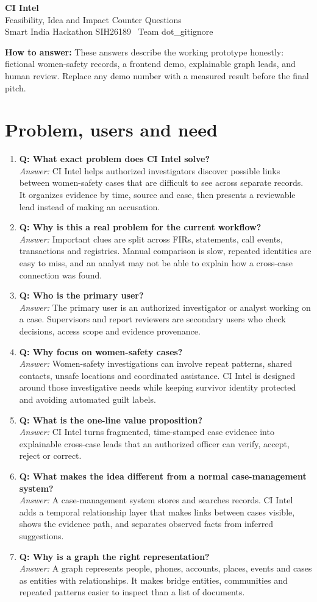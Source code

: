 \documentclass[10pt,a4paper]{article}
\newcommand{\qa}[2]{\item \textbf{\color{navy}Q: #1}\\[-1pt]{\color{coral}\textit{Answer:}} #2}
\newcommand{\note}[1]{\vspace{4pt}\noindent\colorbox{paper}{\parbox{\dimexpr\linewidth-2\fboxsep}{\small\textbf{How to answer:} #1}}\vspace{6pt}}
\begin{document}
\begin{center}
{\Huge\bfseries\color{navy}CI Intel}\\[3pt]
{\Large Feasibility, Idea and Impact Counter Questions}\\[5pt]
{\normalsize Smart India Hackathon SIH26189 \textbar\ Team dot\_gitignore}
\end{center}
\note{These answers describe the working prototype honestly: fictional women-safety records, a frontend demo, explainable graph leads, and human review. Replace any demo number with a measured result before the final pitch.}

\section{Problem, users and need}
\begin{enumerate}
\qa{What exact problem does CI Intel solve?}{CI Intel helps authorized investigators discover possible links between women-safety cases that are difficult to see across separate records. It organizes evidence by time, source and case, then presents a reviewable lead instead of making an accusation.}
\qa{Why is this a real problem for the current workflow?}{Important clues are split across FIRs, statements, call events, transactions and registries. Manual comparison is slow, repeated identities are easy to miss, and an analyst may not be able to explain how a cross-case connection was found.}
\qa{Who is the primary user?}{The primary user is an authorized investigator or analyst working on a case. Supervisors and report reviewers are secondary users who check decisions, access scope and evidence provenance.}
\qa{Why focus on women-safety cases?}{Women-safety investigations can involve repeat patterns, shared contacts, unsafe locations and coordinated assistance. CI Intel is designed around those investigative needs while keeping survivor identity protected and avoiding automated guilt labels.}
\qa{What is the one-line value proposition?}{CI Intel turns fragmented, time-stamped case evidence into explainable cross-case leads that an authorized officer can verify, accept, reject or correct.}
\qa{What makes the idea different from a normal case-management system?}{A case-management system stores and searches records. CI Intel adds a temporal relationship layer that makes links between cases visible, shows the evidence path, and separates observed facts from inferred suggestions.}
\qa{Why is a graph the right representation?}{A graph represents people, phones, accounts, places, events and cases as entities with relationships. It makes bridge entities, communities and repeated patterns easier to inspect than a list of documents.}

\end{enumerate}
\end{document}
